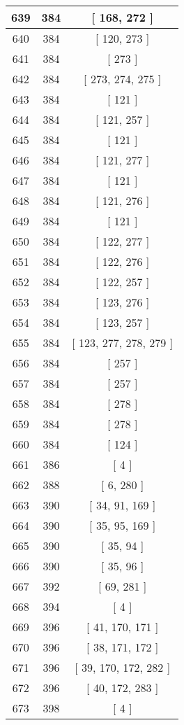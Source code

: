 \begin{center}
\begin{longtable}[H]{|| c c c ||}
\hline
639 & 384 & [ 168, 272 ] \\ 
\hline
640 & 384 & [ 120, 273 ] \\ 
\hline
641 & 384 & [ 273 ] \\ 
\hline
642 & 384 & [ 273, 274, 275 ] \\ 
\hline
643 & 384 & [ 121 ] \\ 
\hline
644 & 384 & [ 121, 257 ] \\ 
\hline
645 & 384 & [ 121 ] \\ 
\hline
646 & 384 & [ 121, 277 ] \\ 
\hline
647 & 384 & [ 121 ] \\ 
\hline
648 & 384 & [ 121, 276 ] \\ 
\hline
649 & 384 & [ 121 ] \\ 
\hline
650 & 384 & [ 122, 277 ] \\ 
\hline
651 & 384 & [ 122, 276 ] \\ 
\hline
652 & 384 & [ 122, 257 ] \\ 
\hline
653 & 384 & [ 123, 276 ] \\ 
\hline
654 & 384 & [ 123, 257 ] \\ 
\hline
655 & 384 & [ 123, 277, 278, 279 ] \\ 
\hline
656 & 384 & [ 257 ] \\ 
\hline
657 & 384 & [ 257 ] \\ 
\hline
658 & 384 & [ 278 ] \\ 
\hline
659 & 384 & [ 278 ] \\ 
\hline
660 & 384 & [ 124 ] \\ 
\hline
661 & 386 & [ 4 ] \\ 
\hline
662 & 388 & [ 6, 280 ] \\ 
\hline
663 & 390 & [ 34, 91, 169 ] \\ 
\hline
664 & 390 & [ 35, 95, 169 ] \\ 
\hline
665 & 390 & [ 35, 94 ] \\ 
\hline
666 & 390 & [ 35, 96 ] \\ 
\hline
667 & 392 & [ 69, 281 ] \\ 
\hline
668 & 394 & [ 4 ] \\ 
\hline
669 & 396 & [ 41, 170, 171 ] \\ 
\hline
670 & 396 & [ 38, 171, 172 ] \\ 
\hline
671 & 396 & [ 39, 170, 172, 282 ] \\ 
\hline
672 & 396 & [ 40, 172, 283 ] \\ 
\hline
673 & 398 & [ 4 ] \\ 

\end{longtable}
\end{center}
